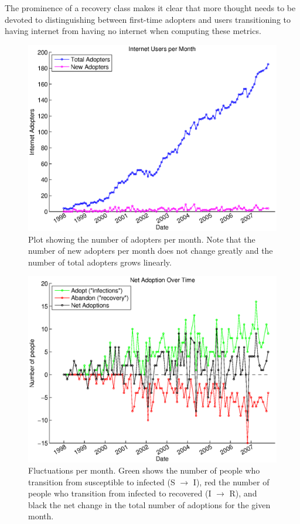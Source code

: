 \documentclass[12pt]{article}
\begin{document}
The prominence of a recovery class makes it clear that more thought needs to be devoted to distinguishing between first-time adopters and users transitioning to having internet from having no internet when computing these metrics.

\begin{figure}[H]
\includegraphics[width = .8\textwidth]{Graficos/AdoptersperMonth.eps}
\caption{Plot showing the number of adopters per month. Note that the number of new adopters per month does not change greatly and the number of total adopters grows linearly.}
\label{fig:AdoptersperMonth}
\end{figure}

\begin{figure}[H]
\includegraphics[width = .8\textwidth]{Graficos/trans.eps}
\caption{Fluctuations per month. Green shows the number of people who transition from susceptible to infected (S \(\rightarrow\) I), red the number of people who transition from infected to recovered (I \(\rightarrow\) R), and black the net change in the total number of adoptions for the given month.}
\label{fig:trans}
\end{figure}
\end{document}
